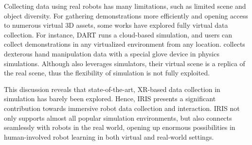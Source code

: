Collecting data using real robots has many limitations, such as limited scene and object diversity. For gathering demonstrations more efficiently and opening access to numerous virtual 3D assets, some works have explored fully virtual data collection.
For instance, DART \cite{dexhub-park} runs a cloud-based simulation, and users can collect demonstrations in any virtualized environment from any location. \citet{mosbach2022accelerating} collects dexterous hand manipulation data with a special glove device in physics simulations.
Although \citet{meng2023virtual} also leverages simulators, their virtual scene is a replica of the real scene, thus the flexibility of simulation is not fully exploited.

This discussion reveals that state-of-the-art, XR-based data collection in simulation has barely been explored. Hence, IRIS presents a significant contribution towards immersive robot data collection and interaction. IRIS not only supports almost all popular simulation environments, but also connects seamlessly with robots in the real world, opening up enormous possibilities in human-involved robot learning in both virtual and real-world settings.